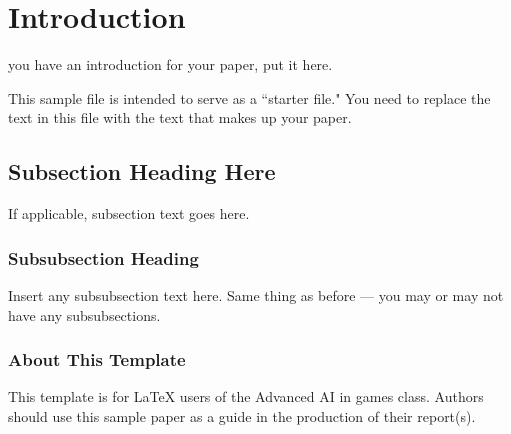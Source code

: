 \section{Introduction}
 you have an introduction for your paper, put it
here.

This sample file is intended to serve as a ``starter file."  You
need to replace the text in this file with the text that makes up
your paper.

\subsection{Subsection Heading Here}
If applicable, subsection text goes here.

\subsubsection{Subsubsection Heading}
Insert any subsubsection text here.  Same thing as before --- you may
or may not have any subsubsections.

\subsubsection{About This Template}
This template is for LaTeX users of the Advanced AI in games class.
Authors should use this sample paper as a guide in the production of
their report(s).

